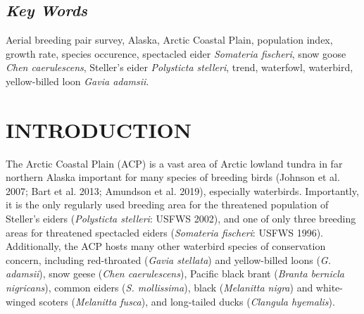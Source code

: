 \documentclass[
]{article}
\begin{document}
\subsection*{\texorpdfstring{\emph{Key
Words}}{Key Words}}\label{key-words}

Aerial breeding pair survey, Alaska, Arctic Coastal Plain, population
index, growth rate, species occurence, spectacled eider \emph{Somateria
fischeri}, snow goose \emph{Chen caerulescens}, Steller's eider
\emph{Polysticta stelleri}, trend, waterfowl, waterbird, yellow-billed
loon \emph{Gavia adamsii}.

\newpage{}

\section*{INTRODUCTION}\label{introduction}

The Arctic Coastal Plain (ACP) is a vast area of Arctic lowland tundra
in far northern Alaska important for many species of breeding birds
(Johnson et al. 2007; Bart et al. 2013; Amundson et al. 2019),
especially waterbirds. Importantly, it is the only regularly used
breeding area for the threatened population of Steller's eiders
(\emph{Polysticta stelleri}: USFWS 2002), and one of only three breeding
areas for threatened spectacled eiders (\emph{Somateria fischeri}: USFWS
1996). Additionally, the ACP hosts many other waterbird species of
conservation concern, including red-throated (\emph{Gavia stellata}) and
yellow-billed loons (\emph{G. adamsii}), snow geese (\emph{Chen
caerulescens}), Pacific black brant (\emph{Branta bernicla nigricans}),
common eiders (\emph{S. mollissima}), black (\emph{Melanitta nigra}) and
white-winged scoters (\emph{Melanitta fusca}), and long-tailed ducks
(\emph{Clangula hyemalis}).
\end{document}
